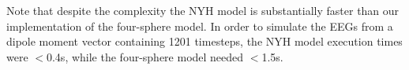 \documentclass[preprint,10pt,authoryear]{elsarticle}
\newcommand{\hlg}[2][Emerald]{ {\sethlcolor{#1} \hl{#2}} }
\newcommand{\tvnnote}[1]{\color{white}{\hlg{TVN: #1 }}\color{black}}
\newcommand{\tvntxt}[1]{{\color{Emerald}#1}}
\begin{document}



Note that \tvntxt{despite the complexity} the NYH model is substantially faster than our implementation of the four-sphere model. In order to simulate the EEGs from a dipole moment vector containing 1201 timesteps, the NYH model execution times were $<$0.4s, while the four-sphere model needed $<$1.5s.
\end{document}
